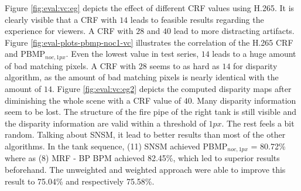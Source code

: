 \noindent Figure \ref{fig:eval:vc:eg} depicts the effect of different CRF values using H.265.
It is clearly visible that a CRF with $14$ leads to feasible results regarding the experience for viewers.
A CRF with $28$ and $40$ lead to more distracting artifacts.
Figure \ref{fig:eval-plots-pbmp-noc1-vc} illustrates the correlation of the H.265 CRF and PBMP$_{noc,1px}$.
Even the lowest value in test series, $14$ leads to a huge amount of bad matching pixels.
A CRF with $28$ seems to as hard as $14$ for disparity algorithm, as the amount of bad matching pixels is nearly identical with the amount of $14$.
\newline\newline\noindent Figure \ref{fig:eval:vc:eg2} depicts the computed disparity maps after diminishing the whole scene with a CRF value of $40$.
Many disparity information seem to be lost.
The structure of the fire pipe of the right tank is still visible and the disparity information are valid within a threshold of $1px$.
The rest feels a bit random.
\newline\newline\noindent Talking about SNSM, it lead to better results than most of the other algorithms.
In the tank sequence, (11) SNSM achieved PBMP$_{noc,1px}$ = 80.72\% where as (8) MRF - BP BPM achieved 82.45\%, which led to superior results beforehand.
The unweighted and weighted approach were able to improve this result to 75.04\% and respectively 75.58\%.


